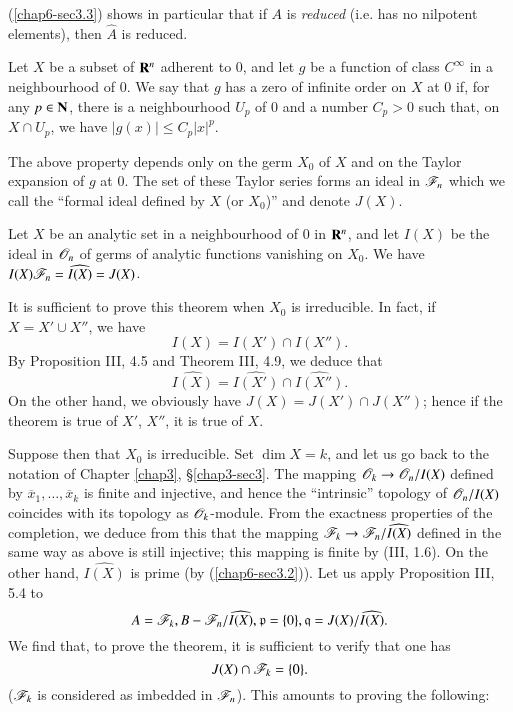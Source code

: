 (\ref{chap6-sec3.3}) shows in particular that if $A$ is {\em reduced} (i.e. has no nilpotent elements), then $\widehat{A}$ is reduced.

\setcounter{theorem}{3}
\begin{definition}\label{chap6-defi3.4}
Let $X$ be a subset of $\mathbf{R}^{n}$ adherent to $0$, and let $g$ be a function of class $C^{\infty}$ in a neighbourhood of $0$. We say that $g$ has a zero of infinite order on $X$ at $0$ if, for any $p\in \mathbf{N}$, there is a neighbourhood $U_{p}$ of $0$ and a number $C_{p}>0$ such that, on $X\cap U_{p}$, we have $|g(x)|\leq C_{p}|x|^{p}$.
\end{definition}

The above property depends only on the germ $X_{0}$ of $X$ and on the Taylor expansion of $g$ at $0$. The set of these Taylor series forms an ideal in $\mathscr{F}_{n}$ which we call the ``formal ideal defined by $X$ (or $X_{0}$)'' and denote $J(X)$.

\begin{theorem}\label{chap6-thm3.5}
Let $X$ be an analytic set in a neighbourhood of $0$ in $\mathbf{R}^{n}$, and let $I(X)$ be the ideal in $\mathscr{O}_{n}$ of germs of analytic functions vanishing on $X_{0}$. We have $I(X)\mathscr{F}_{n}=\widehat{I(X)}=J(X)$.
\end{theorem}

It is sufficient to prove this theorem when $X_{0}$ is irreducible. In fact, if $X=X'\cup X''$, we have
$$
I(X)=I(X')\cap I(X'').
$$
By Proposition III, 4.5 and Theorem III, 4.9, we deduce that 
$$
\widehat{I(X)}=\widehat{I(X')}\cap \widehat{I(X'')}.
$$\pageoriginale
On the other hand, we obviously have $J(X)=J(X')\cap J(X'')$; hence if the theorem is true of $X'$, $X''$, it is true of $X$.

Suppose then that $X_{0}$ is irreducible. Set $\dim X=k$, and let us go back to the notation of Chapter \ref{chap3}, \S\ref{chap3-sec3}. The mapping $\mathscr{O}_{k}\to \mathscr{O}_{n}/I(X)$ defined by $\overline{x}_{1},\ldots,\overline{x}_{k}$ is finite and injective, and hence the ``intrinsic'' topology of $\mathscr{O}_{n}/I(X)$ coincides with its topology as $\mathscr{O}_{k}$-module. From the exactness properties of the completion, we deduce from this that the mapping $\mathscr{F}_{k}\to \mathscr{F}_{n}/\widehat{I(X)}$ defined in the same way as above is still injective; this mapping is finite by (III, 1.6). On the other hand, $\widehat{I(X)}$ is prime (by (\ref{chap6-sec3.2})). Let us apply Proposition III, 5.4 to
$$
A=\mathscr{F}_{k}, B-\mathscr{F}_{n}/\widehat{I(X)}, \mathfrak{p}=\{0\}, \mathfrak{q}=J(X)/\widehat{I(X)}.
$$
We find that, to prove the theorem, it is sufficient to verify that one has
$$
J(X)\cap \mathscr{F}_{k}=\{0\}.
$$
($\mathscr{F}_{k}$ is considered as imbedded in $\mathscr{F}_{n}$). This amounts to proving the following:

